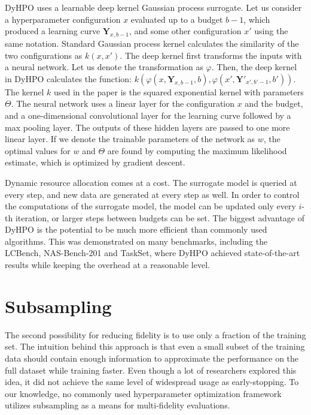 DyHPO uses a learnable deep kernel Gaussian process surrogate. Let us consider a hyperparameter configuration $x$ evaluated up to a budget $b-1$, which produced a learning curve $\mathbf{Y}_{x,b-1}$, and some other configuration $x'$ using the same notation. Standard Gaussian process kernel calculates the similarity of the two configurations as $k(x,x')$. The deep kernel first transforms the inputs with a neural network. Let us denote the transformation as $\varphi$. Then, the deep kernel in DyHPO calculates the function: $k(\varphi(x,\mathbf{Y}_{x,b-1}, b), \varphi(x',\mathbf{Y}'_{x',b'-1}, b'))$. The kernel $k$ used in the paper is the squared exponential kernel with parameters $\Theta$. The neural network uses a linear layer for the configuration $x$ and the budget, and a one-dimensional convolutional layer for the learning curve followed by a max pooling layer. The outputs of these hidden layers are passed to one more linear layer. If we denote the trainable parameters of the network as $w$, the optimal values for $w$ and $\Theta$ are found by computing the maximum likelihood estimate, which is optimized by gradient descent.

Dynamic resource allocation comes at a cost. The surrogate model is queried at every step, and new data are generated at every step as well. In order to control the computations of the surrogate model, the model can be updated only every $i$-th iteration, or larger steps between budgets can be set. The biggest advantage of DyHPO is the potential to be much more efficient than commonly used algorithms. This was demonstrated on many benchmarks, including the LCBench, NAS-Bench-201 and TaskSet, where DyHPO achieved state-of-the-art results while keeping the overhead at a reasonable level.



\section{Subsampling}
The second possibility for reducing fidelity is to use only a fraction of the training set. The intuition behind this approach is that even a small subset of the training data should contain enough information to approximate the performance on the full dataset while training faster. Even though a lot of researchers explored this idea, it did not achieve the same level of widespread usage as early-stopping. To our knowledge, no commonly used hyperparameter optimization framework utilizes subsampling as a means for multi-fidelity evaluations.

